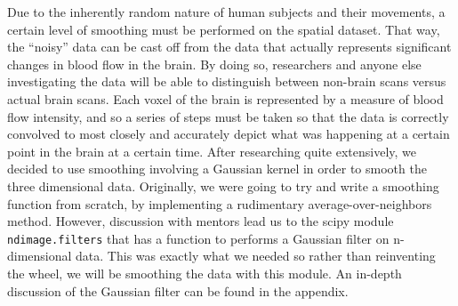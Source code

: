 \par \indent Due to the inherently random nature of human subjects and their 
movements, a certain level of smoothing must be performed on the spatial 
dataset. That way, the ``noisy'' data can be cast off from the data that 
actually represents significant changes in blood flow in the brain. By doing 
so, researchers and anyone else investigating the data will be able to 
distinguish between non-brain scans versus actual brain scans. Each voxel of 
the brain is represented by a measure of blood flow intensity, and so a 
series of steps must be taken so that the data is correctly convolved to most 
closely and accurately depict what was happening at a certain point in the 
brain at a certain time. After researching quite extensively, we decided to 
use smoothing involving a Gaussian kernel in order to smooth the three 
dimensional data. Originally, we were going to try and write a smoothing 
function from scratch, by implementing a rudimentary average-over-neighbors 
method. However, discussion with mentors lead us to the scipy module 
\texttt{ndimage.filters} that has a function to performs a Gaussian filter on 
n-dimensional data. This was exactly what we needed so rather than reinventing 
the wheel, we will be smoothing the data with this module. An in-depth 
discussion of the Gaussian filter can be found in the appendix.
